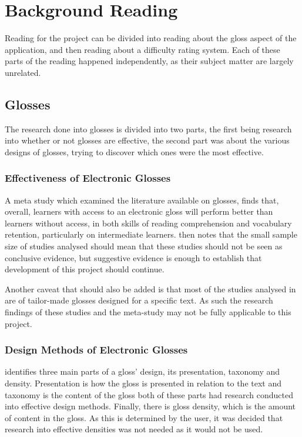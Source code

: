 \chapter{Background Reading}

Reading for the project can be divided into reading about the gloss aspect of the application, and then reading about a difficulty rating system. Each of these parts of the reading happened independently, as their subject matter are largely unrelated.


\section{Glosses}

The research done into glosses is divided into two parts, the first being research into whether or not glosses are effective, the second part was about the various designs of glosses, trying to discover which ones were the most effective.

\subsection{Effectiveness of Electronic Glosses}

A meta study \autocite{abraham2008} which examined the literature available on glosses, finds that, overall, learners with access to an electronic gloss will perform better than learners without access, in both skills of reading comprehension and vocabulary retention, particularly on intermediate learners. \textcite{abraham2008} then notes that the small sample size of studies analysed should mean that these studies should not be seen as conclusive evidence, but suggestive evidence is enough to establish that development of this project should continue.

Another caveat that should also be added is that most of the studies analysed in \textcite{abraham2008} are of tailor-made glosses designed for a specific text. As such the research findings of these studies and the meta-study may not be fully applicable to this project.


\subsection{Design Methods of Electronic Glosses}

\textcite{roby1999} identifies three main parts of a gloss' design, its presentation, taxonomy and density. Presentation is how the gloss is presented in relation to the text and taxonomy is the content of the gloss both of these parts had research conducted into effective design methods. Finally, there is gloss density, which is the amount of content in the gloss. As this is determined by the user, it was decided that research into effective densities was not needed as it would not be used.

